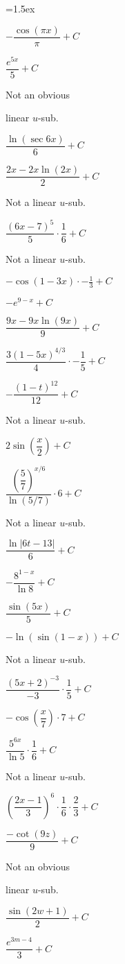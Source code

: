 \documentclass[11pt,letterpaper]{article}
\newenvironment{3enumerate}{%
	\begin{enumerate}[(1)]
	\begin{multicols}{3}
	}{%
	\end{multicols}
	\end{enumerate}
}
\begin{document}
\begin{3enumerate} \itemsep=1.5ex
\item $-\dfrac{\cos(\pi x)}{\pi} + C$
\item $\dfrac{e^{5x}}{5} + C$
\item Not an obvious \par linear $u$-sub.
\item $\dfrac{\ln(\sec 6x)}{6} + C$
\item $\dfrac{2x - 2x \ln(2x)}{2} + C$
\item Not a linear $u$-sub.
\item $\dfrac{(6x - 7)^5}{5} \cdot \dfrac{1}{6} + C$
\item Not a linear $u$-sub.
\item $-\cos(1 - 3x) \cdot -\frac{1}{3} + C$
\item $-e^{9 - x} + C$
\item $\dfrac{9x - 9x \ln(9x)}{9} + C$
\item $\dfrac{3(1 - 5x)^{4/3}}{4} \cdot -\dfrac{1}{5} + C$
\item $-\dfrac{(1 - t)^{12}}{12} + C$
\item Not a linear $u$-sub.
\item $2 \sin\left( \dfrac{x}{2} \right) + C$
\item $\dfrac{\left( \dfrac{5}{7} \right)^{x/6}}{\ln(5/7)} \cdot 6 + C$
\item Not a linear $u$-sub.
\item $\dfrac{\ln|6t - 13|}{6} + C$
\item $-\dfrac{8^{1-x}}{\ln 8} + C$
\item $\dfrac{\sin(5x)}{5} + C$
\item $-\ln(\sin(1 - x)) + C$
\item Not a linear $u$-sub.
\item $\dfrac{(5x + 2)^{-3}}{-3} \cdot \dfrac{1}{5} + C$
\item $-\cos \left( \dfrac{x}{7} \right) \cdot 7 + C$
\item $\dfrac{5^{6x}}{\ln 5} \cdot \dfrac{1}{6} + C$
\item Not a linear $u$-sub.
\item $\left( \dfrac{2x - 1}{3} \right)^6 \cdot \dfrac{1}{6} \cdot \dfrac{2}{3} + C$
\item $\dfrac{-\cot(9z)}{9} + C$
\item Not an obvious \par linear $u$-sub.
\item $\dfrac{\sin(2w + 1)}{2} + C$
\item $\dfrac{e^{3m - 4}}{3} + C$

\end{3enumerate}
\end{document}
